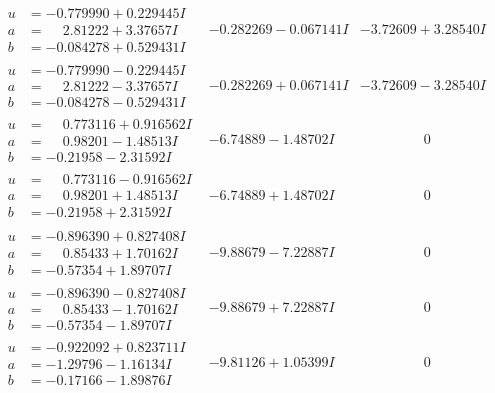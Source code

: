 \documentclass[1p]{elsarticle_modified}
\theoremstyle{definition}
\begin{document}
$$\begin{array}{c|c|c}
\begin{aligned}
u &= -0.779990 + 0.229445 I \\
a &= \phantom{-}2.81222 + 3.37657 I \\
b &= -0.084278 + 0.529431 I\end{aligned}
 & -0.282269 - 0.067141 I & -3.72609 + 3.28540 I \\ \hline\begin{aligned}
u &= -0.779990 - 0.229445 I \\
a &= \phantom{-}2.81222 - 3.37657 I \\
b &= -0.084278 - 0.529431 I\end{aligned}
 & -0.282269 + 0.067141 I & -3.72609 - 3.28540 I \\ \hline\begin{aligned}
u &= \phantom{-}0.773116 + 0.916562 I \\
a &= \phantom{-}0.98201 - 1.48513 I \\
b &= -0.21958 - 2.31592 I\end{aligned}
 & -6.74889 - 1.48702 I & \phantom{-0.000000 } 0 \\ \hline\begin{aligned}
u &= \phantom{-}0.773116 - 0.916562 I \\
a &= \phantom{-}0.98201 + 1.48513 I \\
b &= -0.21958 + 2.31592 I\end{aligned}
 & -6.74889 + 1.48702 I & \phantom{-0.000000 } 0 \\ \hline\begin{aligned}
u &= -0.896390 + 0.827408 I \\
a &= \phantom{-}0.85433 + 1.70162 I \\
b &= -0.57354 + 1.89707 I\end{aligned}
 & -9.88679 - 7.22887 I & \phantom{-0.000000 } 0 \\ \hline\begin{aligned}
u &= -0.896390 - 0.827408 I \\
a &= \phantom{-}0.85433 - 1.70162 I \\
b &= -0.57354 - 1.89707 I\end{aligned}
 & -9.88679 + 7.22887 I & \phantom{-0.000000 } 0 \\ \hline\begin{aligned}
u &= -0.922092 + 0.823711 I \\
a &= -1.29796 - 1.16134 I \\
b &= -0.17166 - 1.89876 I\end{aligned}
 & -9.81126 + 1.05399 I & \phantom{-0.000000 } 0 \\ \hline\begin{aligned}

\end{aligned}
\end{array}$$
\end{document}

